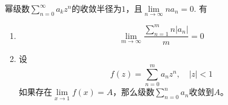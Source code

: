 \begin{theorem}[Tauber定理]

    幂级数$\sum\limits_{n = 0}^{\infty}{a_k z^n}$的收敛半径为$1$，且$\lim\limits_{n \to \infty}{na_n} = 0$. 有

    \begin{enumerate}
        
        \item $$\lim\limits_{m \to \infty}{\dfrac{\sum\limits_{n = 1}^{m}{n|a_n|}}{m}} = 0$$
        
        \item 
            设
            $$f(z) = \sum\limits_{n = 0}^{m}{a_n z^n}, \quad |z| < 1$$
            如果存在$\lim\limits_{x \to 1}{f(x)} = A$，那么级数$\sum\limits_{n = 0}^{n}{a_n}$收敛到$A$。
        
    \end{enumerate}

\end{theorem}

